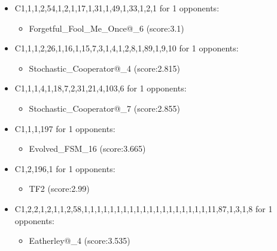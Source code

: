 \begin{appendices}
\begin{itemize}
        \item C1,1,1,2,54,1,2,1,17,1,31,1,49,1,33,1,2,1 for 1 opponents:
        \begin{multicols}{3}
            \begin{itemize}
                \item Forgetful\_Fool\_Me\_Once@\_6 (score:3.1)
            \end{itemize}
        \end{multicols}

        \item C1,1,1,2,26,1,16,1,15,7,3,1,4,1,2,8,1,89,1,9,10 for 1 opponents:
        \begin{multicols}{3}
            \begin{itemize}
                \item Stochastic\_Cooperator@\_4 (score:2.815)
            \end{itemize}
        \end{multicols}

        \item C1,1,1,4,1,18,7,2,31,21,4,103,6 for 1 opponents:
        \begin{multicols}{3}
            \begin{itemize}
                \item Stochastic\_Cooperator@\_7 (score:2.855)
            \end{itemize}
        \end{multicols}

        \item C1,1,1,197 for 1 opponents:
        \begin{multicols}{3}
            \begin{itemize}
                \item Evolved\_FSM\_16 (score:3.665)
            \end{itemize}
        \end{multicols}

        \item C1,2,196,1 for 1 opponents:
        \begin{multicols}{3}
            \begin{itemize}
                \item TF2 (score:2.99)
            \end{itemize}
        \end{multicols}

        \item C1,2,2,1,2,1,1,2,58,1,1,1,1,1,1,1,1,1,1,1,1,1,1,1,1,1,1,1,11,87,1,3,1,8 for 1 opponents:
        \begin{multicols}{3}
            \begin{itemize}
                \item Eatherley@\_4 (score:3.535)
            \end{itemize}
        \end{multicols}


\end{itemize}
\end{appendices}
